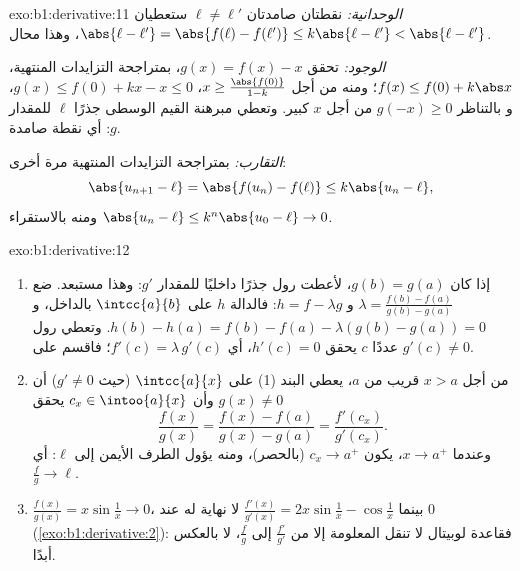 \begin{solution}{exo:b1:derivative:11}
\emph{الوحدانية:} نقطتان صامدتان $\ell \neq \ell'$ ستعطيان
$\abs{\ell - \ell'} = \abs{f(\ell) - f(\ell')} \leq k\abs{\ell -
\ell'} < \abs{\ell - \ell'}$، وهذا محال.

\emph{الوجود:} تحقق $g(x) = f(x) - x$، بمتراجحة التزايدات
المنتهية، $f(x) \leq f(0) + k\abs x$؛ ومنه من أجل $x \geq
\frac{\abs{f(0)}}{1 - k}$، $g(x) \leq f(0) + kx - x \leq 0$، و
بالتناظر $g(-x) \geq 0$ من أجل $x$ كبير. وتعطي مبرهنة القيم
الوسطى جذرًا $\ell$ للمقدار $g$: أي نقطة صامدة.

\emph{التقارب:} بمتراجحة التزايدات المنتهية مرة أخرى:
\[
\abs{u_{n+1} - \ell} = \abs{f(u_n) - f(\ell)} \leq k\abs{u_n - \ell},
\]
ومنه بالاستقراء $\abs{u_n - \ell} \leq k^n \abs{u_0 - \ell} \to 0$.
\end{solution}

\begin{solution}{exo:b1:derivative:12}
\begin{enumerate}
  \item إذا كان $g(b) = g(a)$، لأعطت رول جذرًا داخليًا للمقدار
        $g'$: وهذا مستبعد. ضع $\lambda = \frac{f(b) - f(a)}{g(b) -
        g(a)}$ و $h = f - \lambda g$: فالدالة $h$  على
        $\intcc{a}{b}$  بالداخل، و $h(b) - h(a)
        = f(b) - f(a) - \lambda(g(b) - g(a)) = 0$. وتعطي رول
        عددًا $c$ يحقق $h'(c) = 0$، أي $f'(c) =
        \lambda\,g'(c)$؛ فاقسم على $g'(c) \neq 0$.
  \item من أجل $x > a$ قريب من $a$، يعطي البند (1) على $\intcc{a}{x}$
        (حيث $g' \neq 0$) أن $g(x) \neq 0$ وأن $c_x \in
        \intoo{a}{x}$ يحقق
        \[
        \frac{f(x)}{g(x)} = \frac{f(x) - f(a)}{g(x) - g(a)}
        = \frac{f'(c_x)}{g'(c_x)} .
        \]
        وعندما $x \to a^+$، يكون $c_x \to a^+$ (بالحصر)، ومنه يؤول الطرف
        الأيمن إلى $\ell$: أي $\frac{f}{g} \to \ell$.
  \item $\frac{f(x)}{g(x)} = x\sin\frac1x \to 0$، بينما
        $\frac{f'(x)}{g'(x)} = 2x\sin\frac1x - \cos\frac1x$ لا
        نهاية له عند $0$ (\cref{exo:b1:derivative:2}):
        فقاعدة لوبيتال لا تنقل المعلومة إلا من
        $\frac{f'}{g'}$ إلى $\frac fg$، لا بالعكس أبدًا.
\end{enumerate}
\end{solution}

